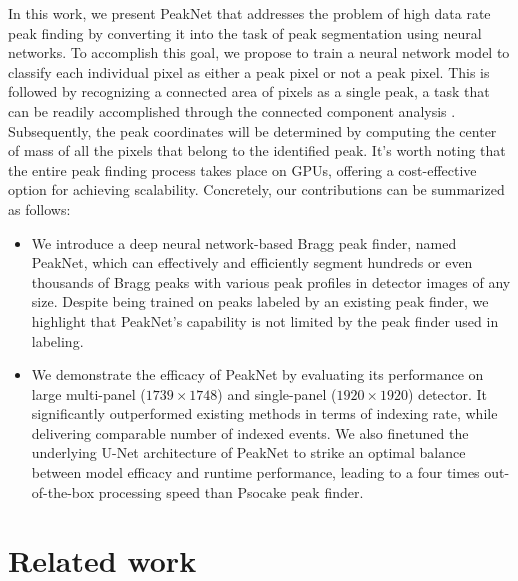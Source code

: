 \documentclass[conference]{IEEEtran}
\newcommand{\peaknet}{PeakNet}
\newcommand{\psocake}{Psocake}
\begin{document}
In this work, we present \peaknet{} that addresses the problem of high data rate
peak finding by converting it into the task of peak segmentation using neural
networks.  To accomplish this goal, we propose to train a neural network model
to classify each individual pixel as either a peak pixel or not a peak pixel.
This is followed by recognizing a connected area of pixels as a single peak, a
task that can be readily accomplished through the connected component analysis
\citep{weaverCentrosymmetricCrossSymmetricMatrices1985}.  Subsequently, the peak
coordinates will be determined by computing the center of mass of all the pixels
that belong to the identified peak.  It's worth noting that the entire peak
finding process takes place on GPUs, offering a cost-effective option for
achieving scalability.  Concretely, our contributions can be summarized as
follows:

\begin{itemize}

    \item We introduce a deep neural network-based Bragg peak finder, named
    \peaknet{}, which can effectively and efficiently segment hundreds or even
    thousands of Bragg peaks with various peak profiles in detector images of
    any size.  Despite being trained on peaks labeled by an existing peak finder,
    we highlight that \peaknet{}'s capability is not limited by the peak finder
    used in labeling.

    \item We demonstrate the efficacy of \peaknet{} by evaluating its
    performance on large multi-panel ($1739 \times 1748$) and single-panel
    ($1920 \times 1920$) detector.  It significantly outperformed existing
    methods in terms of indexing rate, while delivering comparable number of
    indexed events.  We also finetuned the underlying U-Net architecture of
    \peaknet{} to strike an optimal balance between model efficacy and runtime
    performance, leading to a four times out-of-the-box processing speed than
    \psocake{} peak finder.

\end{itemize}


\section{Related work}
\end{document}
